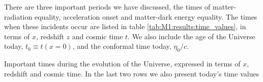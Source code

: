 There are three important periods we have discussed, the times of matter-radiation equality, acceleration onset and matter-dark energy equality. The times when these incidents occur are listed in table \ref{tab:M1:results:time_values}, in terms of $x$, redshift $z$ and cosmic time $t$. We also include the age of the Universe today, $t_0\equiv t(x=0)$, and the conformal time today, $\eta_0/c$. 
\begin{table*}[ht!]
    \raggedright
    
    \label{tab:M1:results:time_values}
    \caption{Important times during the evolution of the Universe, expressed in terms of $x$, redshift and cosmic time. In the last two rows we also present today's time values}
\end{table*}